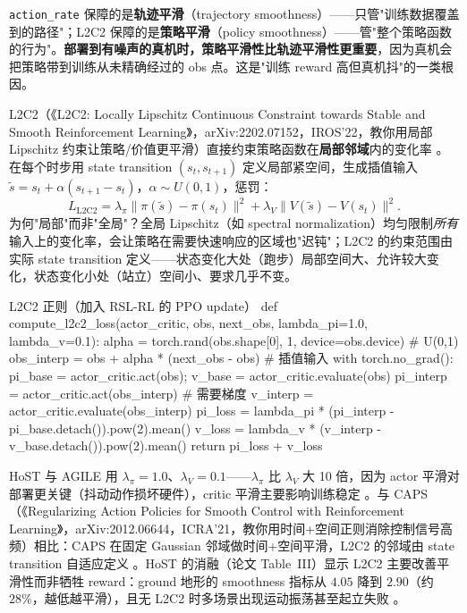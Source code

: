 \begin{insight}\label{ins:rlmc-diag-l2c2}
\verb|action_rate| 保障的是\textbf{轨迹平滑}（trajectory smoothness）——只管"训练数据覆盖到的路径"；L2C2 保障的是\textbf{策略平滑}（policy smoothness）——管"整个策略函数的行为"。\textbf{部署到有噪声的真机时，策略平滑性比轨迹平滑性更重要}，因为真机会把策略带到训练从未精确经过的 obs 点。这是"训练 reward 高但真机抖"的一类根因。
\end{insight}

L2C2（《L2C2: Locally Lipschitz Continuous Constraint towards Stable and Smooth Reinforcement Learning》，arXiv:2202.07152，IROS'22，教你用局部 Lipschitz 约束让策略/价值更平滑）直接约束策略函数在\textbf{局部邻域}内的变化率 \cite{kobayashi2022l2c2}。在每个时步用 state transition $(s_t,s_{t+1})$ 定义局部紧空间，生成插值输入 $\tilde s = s_t + \alpha(s_{t+1}-s_t)$，$\alpha\sim U(0,1)$，惩罚：
\begin{equation}
L_{\text{L2C2}} = \lambda_\pi \|\pi(\tilde s)-\pi(s_t)\|^2 + \lambda_V \|V(\tilde s)-V(s_t)\|^2 .
\label{eq:rlmc-diag-l2c2loss}
\end{equation}
为何"局部"而非"全局"？全局 Lipschitz（如 spectral normalization）均匀限制\emph{所有}输入上的变化率，会让策略在需要快速响应的区域也"迟钝"；L2C2 的约束范围由实际 state transition 定义——状态变化大处（跑步）局部空间大、允许较大变化，状态变化小处（站立）空间小、要求几乎不变。

\begin{codebox}[Python]{L2C2 正则（加入 RSL-RL 的 PPO update）}
def compute_l2c2_loss(actor_critic, obs, next_obs, lambda_pi=1.0, lambda_v=0.1):
    alpha = torch.rand(obs.shape[0], 1, device=obs.device)   # U(0,1)
    obs_interp = obs + alpha * (next_obs - obs)              # 插值输入
    with torch.no_grad():
        pi_base = actor_critic.act(obs); v_base = actor_critic.evaluate(obs)
    pi_interp = actor_critic.act(obs_interp)                 # 需要梯度
    v_interp  = actor_critic.evaluate(obs_interp)
    pi_loss = lambda_pi * (pi_interp - pi_base.detach()).pow(2).mean()
    v_loss  = lambda_v  * (v_interp  - v_base.detach()).pow(2).mean()
    return pi_loss + v_loss
\end{codebox}

HoST 与 AGILE 用 $\lambda_\pi=1.0$、$\lambda_V=0.1$——$\lambda_\pi$ 比 $\lambda_V$ 大 10 倍，因为 actor 平滑对部署更关键（抖动动作损坏硬件），critic 平滑主要影响训练稳定 \cite{huang2025host,nvidia2026agile}。与 CAPS（《Regularizing Action Policies for Smooth Control with Reinforcement Learning》，arXiv:2012.06644，ICRA'21，教你用时间+空间正则消除控制信号高频）相比：CAPS 在固定 Gaussian 邻域做时间+空间平滑，L2C2 的邻域由 state transition 自适应定义 \cite{mysore2021caps}。HoST 的消融（论文 Table~III）显示 L2C2 主要改善平滑性而非牺牲 reward：ground 地形的 smoothness 指标从 $4.05$ 降到 $2.90$（约 $28\%$，越低越平滑），且无 L2C2 时多场景出现运动振荡甚至起立失败 \cite{huang2025host}。


